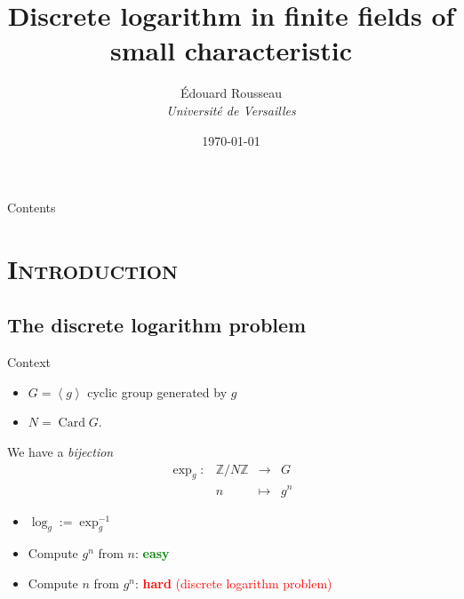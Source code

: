 \documentclass[xcolor=x11names,compress]{beamer}
\theoremstyle{break}
\theoremstyle{sc}
\theoremstyle{definition}
\theoremstyle{remark}
\DeclareMathOperator{\Card}{Card}
\begin{document}
\begin{frame}
  \title{Discrete logarithm in finite fields of small characteristic}
\author{
Édouard Rousseau\\
{\it Université de Versailles\\}
}
\date{\today}
\titlepage
\end{frame}

\begin{frame}{Contents}
\tableofcontents
\end{frame}

\section{\scshape Introduction}
\subsection{The discrete logarithm problem}
\begin{frame}{Context}
  \begin{itemize}
    \item $G=\left\langle g \right\rangle$ cyclic group generated by $g$
    \item $N=\Card G$.
    \end{itemize}
  
  We have a \emph{bijection}
  \[
    \begin{array}{cccc}
      \exp_g: & \mathbb{Z}/N\mathbb{Z} & \to & G \\
      & n & \mapsto & g^n
    \end{array}
  \]

  \begin{itemize}
    \item $\log_g:=\exp_g^{-1}$
   \item Compute $g^n$ from $n$: \textcolor{green}{\bf easy}
    \item Compute $n$ from $g^n$: \textcolor{red}{\textbf{hard} (discrete
    logarithm problem)}
  \end{itemize}
\end{frame}
\end{document}
